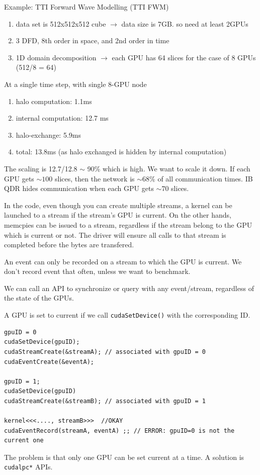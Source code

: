 Example: TTI Forward Wave Modelling (TTI FWM)
\begin{enumerate}
  \item data set is 512x512x512 cube $\rightarrow$ data size is 7GB. so need at
  least 2GPUs
  \item 3 DFD, 8th order in space, and 2nd order in time
  \item 1D domain decomposition $\rightarrow$ each GPU has 64 slices for
  the case of 8 GPUs (512/8 = 64)
\end{enumerate}
At a single time step, with single 8-GPU node
\begin{enumerate}
  \item halo computation: 1.1ms
  \item internal computation: 12.7 ms
  \item halo-exchange: 5.9ms
  \item total: 13.8ms (as halo exchanged is hidden by internal computation)
\end{enumerate}
The scaling is 12.7/12.8 $\sim $ 90\% which is high. We want to scale it down.
If each GPU gets $\sim 100$ slices, then the network is $\sim 68\%$ of all
communication times. IB QDR hides communication when each GPU gets $\sim 70$
slices. 


In the code, even though you can create multiple streams, a kernel can be
launched to a stream if the stream's GPU is current. On the other hands,
memcpies can be issued to a stream, regardless if the stream belong to the GPU
which is current or not. The driver will ensure all calls to that stream is
completed before the bytes are transfered. 

An event can only be recorded on a stream to which the GPU is current. We don't
record event that often, unless we want to benchmark. 

We can call an API to synchronize or query with any event/stream, regardless of
the state of the GPUs. 

A GPU is set to current if we call \verb!cudaSetDevice()! with the
corresponding ID. 
\begin{verbatim}
gpuID = 0
cudaSetDevice(gpuID);
cudaStreamCreate(&streamA); // associated with gpuID = 0
cudaEventCreate(&eventA);

gpuID = 1;
cudaSetDevice(gpuID)
cudaStreamCreate(&streamB); // associated with gpuID = 1

kernel<<<...., streamB>>>  //OKAY
cudaEventRecord(streamA, eventA) ;; // ERROR: gpuID=0 is not the current one

\end{verbatim}
The problem is that only one GPU can be set current at a time. A solution is
\verb!cudalpc*! APIs.


